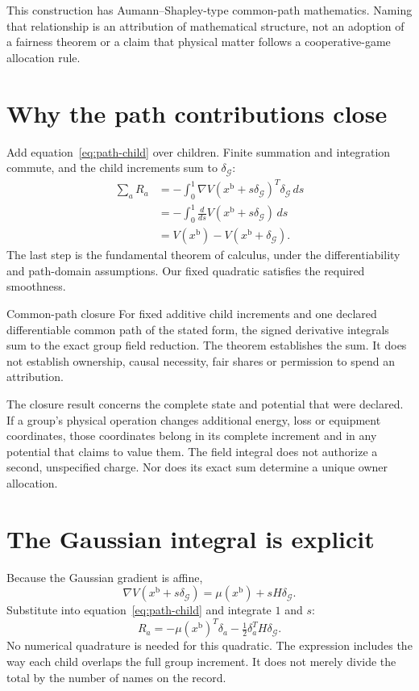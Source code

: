 This construction has Aumann--Shapley-type common-path mathematics. Naming that relationship is an attribution of mathematical structure, not an adoption of a fairness theorem or a claim that physical matter follows a cooperative-game allocation rule.

\section{Why the path contributions close}
Add equation~\eqref{eq:path-child} over children. Finite summation and integration commute, and the child increments sum to $\delta_{\mathcal G}$:
\begin{align}
 \sum_aR_a
 &=-\int_0^1\nabla V(x^{\mathrm{b}}+s\delta_{\mathcal G})^T\delta_{\mathcal G}\,ds\\
 &=-\int_0^1\frac{d}{ds}V(x^{\mathrm{b}}+s\delta_{\mathcal G})\,ds\\
 &=V(x^{\mathrm{b}})-V(x^{\mathrm{b}}+\delta_{\mathcal G}).
\end{align}
The last step is the fundamental theorem of calculus, under the differentiability and path-domain assumptions. Our fixed quadratic satisfies the required smoothness.

\begin{lawbox}{Common-path closure}
For fixed additive child increments and one declared differentiable common path of the stated form, the signed derivative integrals sum to the exact group field reduction. The theorem establishes the sum. It does not establish ownership, causal necessity, fair shares or permission to spend an attribution.
\end{lawbox}

The closure result concerns the complete state and potential that were declared. If a group's physical operation changes additional energy, loss or equipment coordinates, those coordinates belong in its complete increment and in any potential that claims to value them. The field integral does not authorize a second, unspecified charge. Nor does its exact sum determine a unique owner allocation.

\section{The Gaussian integral is explicit}
Because the Gaussian gradient is affine,
\[
 \nabla V(x^{\mathrm{b}}+s\delta_{\mathcal G})=\mu(x^{\mathrm{b}})+sH\delta_{\mathcal G}.
\]
Substitute into equation~\eqref{eq:path-child} and integrate $1$ and $s$:
\begin{equation}
 R_a=-\mu(x^{\mathrm{b}})^T\delta_a-\tfrac12\delta_a^TH\delta_{\mathcal G}.
\end{equation}
No numerical quadrature is needed for this quadratic. The expression includes the way each child overlaps the full group increment. It does not merely divide the total by the number of names on the record.

